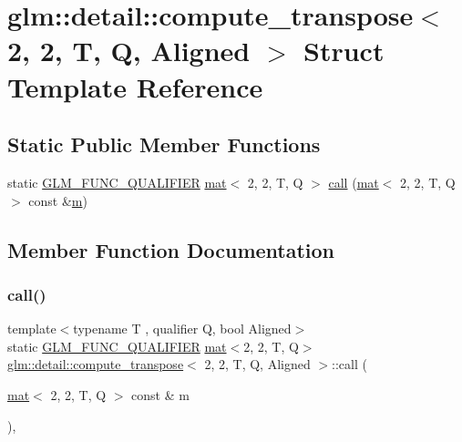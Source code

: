 \hypertarget{structglm_1_1detail_1_1compute__transpose_3_012_00_012_00_01_t_00_01_q_00_01_aligned_01_4}{}\section{glm\+:\+:detail\+:\+:compute\+\_\+transpose$<$ 2, 2, T, Q, Aligned $>$ Struct Template Reference}
\label{structglm_1_1detail_1_1compute__transpose_3_012_00_012_00_01_t_00_01_q_00_01_aligned_01_4}
\subsection*{Static Public Member Functions}
\begin{DoxyCompactItemize}
\item 
static \mbox{\hyperlink{setup_8hpp_a33fdea6f91c5f834105f7415e2a64407}{G\+L\+M\+\_\+\+F\+U\+N\+C\+\_\+\+Q\+U\+A\+L\+I\+F\+I\+ER}} \mbox{\hyperlink{structglm_1_1mat}{mat}}$<$ 2, 2, T, Q $>$ \mbox{\hyperlink{structglm_1_1detail_1_1compute__transpose_3_012_00_012_00_01_t_00_01_q_00_01_aligned_01_4_ab78382e27d6683e2a71805ef245a3ac0}{call}} (\mbox{\hyperlink{structglm_1_1mat}{mat}}$<$ 2, 2, T, Q $>$ const \&\mbox{\hyperlink{_s_d_l__opengl__glext_8h_af593500c283bf1a787a6f947f503a5c2}{m}})
\end{DoxyCompactItemize}


\subsection{Member Function Documentation}
\mbox{\label{structglm_1_1detail_1_1compute__transpose_3_012_00_012_00_01_t_00_01_q_00_01_aligned_01_4_ab78382e27d6683e2a71805ef245a3ac0}} 
\subsubsection{\texorpdfstring{call()}{call()}}
{\footnotesize\ttfamily template$<$typename T , qualifier Q, bool Aligned$>$ \\
static \mbox{\hyperlink{setup_8hpp_a33fdea6f91c5f834105f7415e2a64407}{G\+L\+M\+\_\+\+F\+U\+N\+C\+\_\+\+Q\+U\+A\+L\+I\+F\+I\+ER}} \mbox{\hyperlink{structglm_1_1mat}{mat}}$<$2, 2, T, Q$>$ \mbox{\hyperlink{structglm_1_1detail_1_1compute__transpose}{glm\+::detail\+::compute\+\_\+transpose}}$<$ 2, 2, T, Q, Aligned $>$\+::call (\begin{DoxyParamCaption}\item[{\mbox{\hyperlink{structglm_1_1mat}{mat}}$<$ 2, 2, T, Q $>$ const \&}]{m }\end{DoxyParamCaption})\hspace{0.3cm}{\ttfamily [inline]}, {\ttfamily [static]}}



